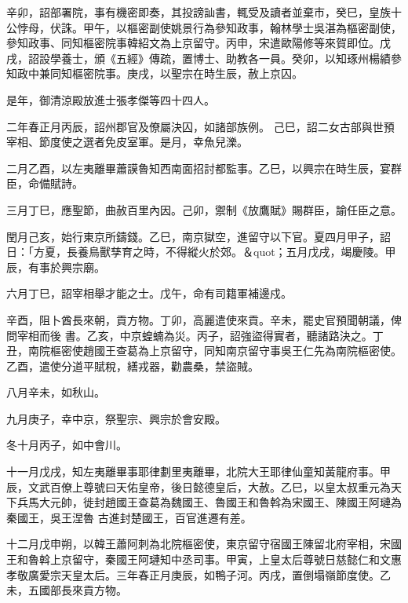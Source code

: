 \begin{pinyinscope}
 辛卯，詔部署院，事有機密即奏，其投謗訕書，輒受及讀者並棄市，癸巳，皇族十公悖母，伏誅。甲午，以樞密副使姚景行為參知政事，翰林學士吳湛為樞密副使，參知政事、同知樞密院事韓紹文為上京留守。丙申，宋遣歐陽修等來賀即位。戊戌，詔設學養士，頒《五經》傳疏，置博士、助教各一員。癸卯，以知琢州楊績參知政中兼同知樞密院事。庚戌，以聖宗在時生辰，赦上京囚。



 是年，御清涼殿放進士張孝傑等四十四人。



 二年春正月丙辰，詔州郡官及僚屬決囚，如諸部族例。
 己巳，詔二女古部與世預宰相、節度使之選者免皮室軍。是月，幸魚兒濼。



 二月乙酉，以左夷離畢蕭謨魯知西南面招討都監事。乙巳，以興宗在時生辰，宴群臣，命備賦詩。



 三月丁巳，應聖節，曲赦百里內因。己卯，禦制《放鷹賦》賜群臣，諭任臣之意。



 閏月己亥，始行東京所鑄錢。乙巳，南京獄空，進留守以下官。夏四月甲子，詔日：「方夏，長養鳥獸孳育之時，不得縱火於郊。＆quot；五月戊戌，竭慶陵。甲辰，有事於興宗廟。



 六月丁巳，詔宰相舉才能之士。戊午，命有司籍軍補邊戍。



 辛酉，阻卜酋長來朝，貢方物。丁卯，高麗遣使來貢。辛未，罷史官預聞朝議，俾問宰相而後
 書。乙亥，中京蝗蝻為災。丙子，詔強盜得實者，聽諸路決之。丁丑，南院樞密使趙國王查葛為上京留守，同知南京留守事吳王仁先為南院樞密使。乙酉，遣使分道平賦稅，繕戎器，勸農桑，禁盜賊。



 八月辛未，如秋山。



 九月庚子，幸中京，祭聖宗、興宗於會安殿。



 冬十月丙子，如中會川。



 十一月戊戌，知左夷離畢事耶律劃里夷離畢，北院大王耶律仙童知黃龍府事。甲辰，文武百僚上尊號曰天佑皇帝，後日懿德皇后，大赦。乙巳，以皇太叔重元為天下兵馬大元帥，徙封趙國王查葛為魏國王、魯國王和魯斡為宋國王、陳國王阿璉為秦國王，吳王涅魯
 古進封楚國王，百官進遷有差。



 十二月戊申朔，以韓王蕭阿刺為北院樞密使，東京留守宿國王陳留北府宰相，宋國王和魯斡上京留守，秦國王阿璉知中丞司事。甲寅，上皇太后尊號日慈懿仁和文惠孝敬廣愛宗天皇太后。三年春正月庚辰，如鴨子河。丙戌，置倒塌嶺節度使。乙未，五國部長來貢方物。




\end{pinyinscope}
